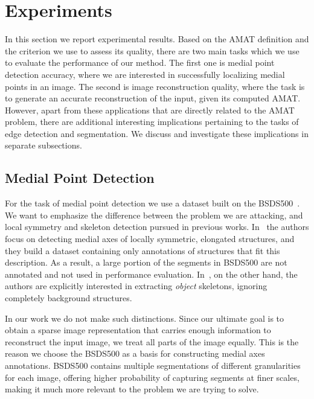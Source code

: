 \documentclass[10pt,twocolumn,letterpaper]{article}
\begin{document}
\section{Experiments}\label{sec:experiments}
In this section we report experimental results.
Based on the AMAT definition and the criterion we use to assess its quality, there are two main tasks which we 
use to evaluate the performance of our method. 
The first one is medial point detection accuracy, where we are interested in successfully localizing medial points
in an image.
The second is image reconstruction quality, where the task is to generate an accurate reconstruction of the input,
given its computed AMAT.
However, apart from these applications that are directly related to the AMAT problem, there are additional 
interesting implications pertaining to the tasks of edge detection and segmentation.
We discuss and investigate these implications in separate subsections.


\subsection{Medial Point Detection}\label{sec:experiments:detection}
For the task of medial point detection we use a dataset built on the BSDS500~\cite{martin2001database,arbelaez2011contour}.
We want to emphasize the difference between the problem we are attacking, and local symmetry
and skeleton detection pursued in previous works.
In~\cite{tsogkas2012learning} the authors focus on detecting medial axes of locally symmetric, elongated structures,
and they build a dataset containing only annotations of structures that fit this description.
As a result, a large portion of the segments in BSDS500 are not annotated and not used in performance evaluation.
In~\cite{shen2016object}, on the other hand, the authors are explicitly interested in extracting \emph{object}
skeletons, ignoring completely background structures.

In our work we do not make such distinctions. Since our ultimate goal is to obtain a sparse image representation
that carries enough information to reconstruct the input image, we treat all parts of the image equally.
This is the reason we choose the BSDS500 as a basis for constructing medial axes annotations.
BSDS500 contains multiple segmentations of different granularities for each image, offering higher probability of
capturing segments at finer scales, making it much more relevant to the problem we are trying to solve.
\end{document}
